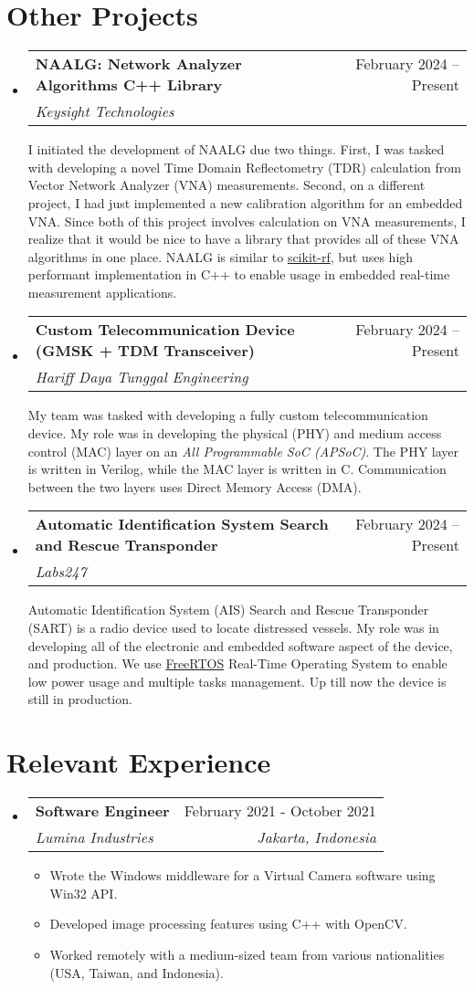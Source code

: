 \documentclass[letterpaper,11pt]{article}
\makeatletter
\newcommand{\resumeItem}[1]{
  \item\small{
    {#1 \vspace{-2pt}}
  }
}
\newcommand{\resumeSubheading}[4]{
  \vspace{-2pt}\item
    \begin{tabular*}{0.97\textwidth}[t]{l@{\extracolsep{\fill}}r}
      \textbf{#1} & #2 \\
      \textit{\small#3} & \textit{\small #4} \\
    \end{tabular*}\vspace{-7pt}
}
\newcommand{\resumeProjectHeading}[3]{
  \item
  \begin{tabular*}{0.97\textwidth}{l@{\extracolsep{\fill}}r}
    \small\textbf{#1} & #2 \\
    \textit{\small#3} \\
  \end{tabular*}\vspace{-7pt}
}
\newcommand{\resumeSubHeadingListStart}{\begin{itemize}[leftmargin=0.15in, label={}]}
\newcommand{\resumeSubHeadingListEnd}{\end{itemize}}
\newcommand{\resumeItemListStart}{\begin{itemize}}
\newcommand{\resumeItemListEnd}{\end{itemize}\vspace{-5pt}}
\makeatother
\begin{document}
\section{Other Projects}
\resumeSubHeadingListStart
\resumeProjectHeading
  {NAALG: Network Analyzer Algorithms C++ Library}{February 2024 -- Present}
  {Keysight Technologies}
\begin{justify}
  I initiated the development of NAALG due two things. First, I was tasked with
  developing a novel Time Domain Reflectometry (TDR) calculation from Vector
  Network Analyzer (VNA) measurements. Second, on a different project, I had
  just implemented a new calibration algorithm for an embedded VNA. Since both
  of this project involves calculation on VNA measurements, I realize that it
  would be nice to have a library that provides all of these VNA algorithms in
  one place. NAALG is similar to
  \href{https://scikit-rf.readthedocs.io}{scikit-rf}, but uses high performant
  implementation in C++ to enable usage in embedded real-time measurement
  applications.
\end{justify}
\resumeProjectHeading
  {Custom Telecommunication Device (GMSK + TDM Transceiver)}{February 2024 -- Present}
  {Hariff Daya Tunggal Engineering}
\begin{justify}
  My team was tasked with developing a fully custom telecommunication device.
  My role was in developing the physical (PHY) and medium access control (MAC)
  layer on an \textit{All Programmable SoC (APSoC)}. The PHY layer is written
  in Verilog, while the MAC layer is written in C. Communication between the
  two layers uses Direct Memory Access (DMA).
\end{justify}
\resumeProjectHeading
  {Automatic Identification System Search and Rescue Transponder}{February 2024 -- Present}
  {Labs247}
\begin{justify}
  Automatic Identification System (AIS) Search and Rescue Transponder (SART) is
  a radio device used to locate distressed vessels. My role was in developing
  all of the electronic and embedded software aspect of the device, and
  production. We use \href{https://freertos.org}{FreeRTOS} Real-Time Operating
  System to enable low power usage and multiple tasks management. Up till now
  the device is still in production.
\end{justify}
\resumeSubHeadingListEnd

\section{Relevant Experience}
\resumeSubHeadingListStart
\resumeSubheading
  {Software Engineer}{February 2021 - October 2021}
  {Lumina Industries}{Jakarta, Indonesia}
\resumeItemListStart
\resumeItem{Wrote the Windows middleware for a Virtual Camera software using
Win32 API.}
\resumeItem{Developed image processing features using C++ with OpenCV.}
\resumeItem{Worked remotely with a medium-sized team from various nationalities
(USA, Taiwan, and Indonesia).}
\resumeItemListEnd
\resumeSubHeadingListEnd
\end{document}
